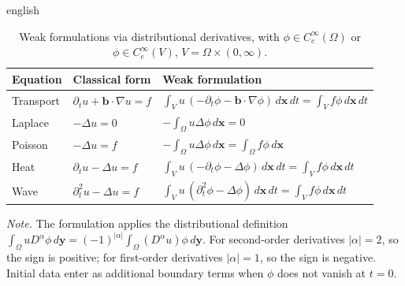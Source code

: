 \documentclass[11pt,letterpaper,twoside,openright]{book} %
\newcommand{\abs}[1]{\left\lvert #1 \right\rvert}
\begin{document}
\begin{hyphenrules}{english}
\begin{table}[htbp]
  \centering
  \caption[Weak formulations via distributional derivatives]{Weak formulations via distributional derivatives, with
  $\phi\in C_c^\infty(\Omega)$ or $\phi\in C_c^\infty(V)$, $V=\Omega\times(0,\infty)$.}
  \label{tab:weak-forms}
  \small
  \begin{tabular}{@{}lll@{}}
    \toprule
    Equation & Classical form & Weak formulation \\
    \midrule
    Transport & $\partial_t u+\mathbf{b}\cdot\nabla u=f$ & $\displaystyle\int_V u\,(-\partial_t\phi-\mathbf{b}\cdot\nabla\phi)\,d\mathbf{x}\,d t=\int_V f\phi\,d\mathbf{x}\,d t$ \\[3mm]
    Laplace   & $-\Delta u=0$ & $\displaystyle-\int_\Omega u\Delta\phi\,d\mathbf{x}=0$ \\[3mm]
    Poisson   & $-\Delta u=f$ & $\displaystyle-\int_\Omega u\Delta\phi\,d\mathbf{x}=\int_\Omega f\phi\,d\mathbf{x}$ \\[3mm]
    Heat      & $\partial_t u-\Delta u=f$ & $\displaystyle\int_V u\,(-\partial_t\phi-\Delta\phi)\,d\mathbf{x}\,d t=\int_V f\phi\,d\mathbf{x}\,d t$ \\[3mm]
    Wave      & $\partial_t^2u-\Delta u=f$ & $\displaystyle\int_V u\,(\partial_t^2\phi-\Delta\phi)\,d\mathbf{x}\,d t=\int_V f\phi\,d\mathbf{x}\,d t$ \\
    \bottomrule
  \end{tabular}
  \par\smallskip
  \parbox{0.92\linewidth}{\footnotesize\emph{Note.} The formulation applies the distributional definition
  $\int_\Omega uD^\alpha\phi\,d\mathbf{y}=(-1)^{\abs{\alpha}}\int_\Omega(D^\alpha u)\phi\,d\mathbf{y}$. For second-order
  derivatives $\abs{\alpha}=2$, so the sign is positive; for first-order derivatives $\abs{\alpha}=1$, so
  the sign is negative. Initial data enter as additional boundary terms when $\phi$ does not vanish at
  $t=0$.}
\end{table}


\end{hyphenrules}
\end{document}
